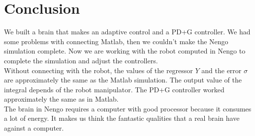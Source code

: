 \section{Conclusion}
We built a brain that makes an adaptive control and a PD+G controller. We had some problems with connecting Matlab, then we couldn't make the Nengo simulation complete. Now we are working with the robot computed in Nengo to complete the simulation and adjust the controllers.\\

Without connecting with the robot, the values of the regressor $Y$ and the error $\sigma$ are approximately the same as the Matlab simulation. The output value of the integral depends of the robot manipulator. The PD+G controller worked approximately the same as in Matlab.\\

The brain in Nengo requires a computer with good processor because it consumes a lot of energy. It makes us think the fantastic qualities that a real brain have against a computer.




% 
